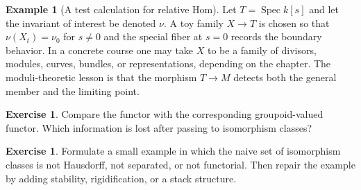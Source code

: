 \documentclass[11pt]{amsart}
\theoremstyle{definition}
\newtheorem{example}[theorem]{Example}
\newtheorem{exercise}[theorem]{Exercise}
\newcommand{\Spec}{\operatorname{Spec}}
\begin{document}
\begin{example}[A test calculation for relative Hom]
Let $T=\Spec k[s]$ and let the invariant of interest be denoted $\nu$.  A toy family $X\to T$ is chosen so that $\nu(X_t)=\nu_0$ for $s\ne0$ and the special fiber at $s=0$ records the boundary behavior.  In a concrete course one may take $X$ to be a family of divisors, modules, curves, bundles, or representations, depending on the chapter.  The moduli-theoretic lesson is that the morphism $T\to M$ detects both the general member and the limiting point.
\end{example}
\begin{exercise}
Compare the functor with the corresponding groupoid-valued functor.  Which information is lost after passing to isomorphism classes?
\end{exercise}
\begin{exercise}
Formulate a small example in which the naive set of isomorphism classes is not Hausdorff, not separated, or not functorial.  Then repair the example by adding stability, rigidification, or a stack structure.
\end{exercise}
\clearpage
\end{document}

